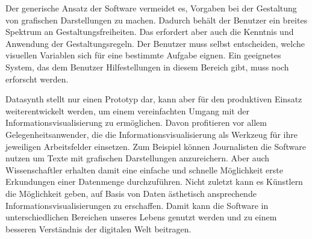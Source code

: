 \documentclass[a4paper, 
               12pt,
               DIV=calc,
               version=first,
               pdftex,
               headsepline,
               footsepline,
               bibtotocnumbered,
               liststotocnumbered]{scrreprt}
\begin{document}
Der generische Ansatz der Software vermeidet es, Vorgaben bei der Gestaltung von
grafischen Darstellungen zu machen. Dadurch behält der Benutzer ein breites Spektrum an Gestaltungsfreiheiten.
Das erfordert aber auch die Kenntnis und Anwendung der Gestaltungsregeln.
Der Benutzer muss selbst entscheiden, welche visuellen Variablen sich für eine
bestimmte Aufgabe eignen. Ein geeignetes System, das dem
Benutzer Hilfestellungen in diesem Bereich gibt, muss noch erforscht werden.

Datasynth stellt nur einen Prototyp dar, kann aber für den
produktiven Einsatz weiterentwickelt werden, um einem vereinfachten Umgang mit
der Informationsvisualisierung zu ermöglichen. Davon profitieren vor allem Gelegenheitsanwender,
die die Informationsvisualisierung als Werkzeug für ihre jeweiligen Arbeitsfelder
einsetzen. Zum Beispiel können Journalisten die Software nutzen um Texte
mit grafischen Darstellungen anzureichern. Aber auch Wissenschaftler
erhalten damit eine einfache und schnelle Möglichkeit
erste Erkundungen einer Datenmenge durchzuführen. Nicht zuletzt kann es Künstlern
die Möglichkeit geben, auf Basis von Daten ästhetisch ansprechende
Informationsvisualisierungen zu erschaffen. Damit kann die Software in unterschiedlichen
Bereichen unseres Lebens genutzt werden und zu einem besseren
Verständnis der digitalen Welt beitragen.
\end{document}
